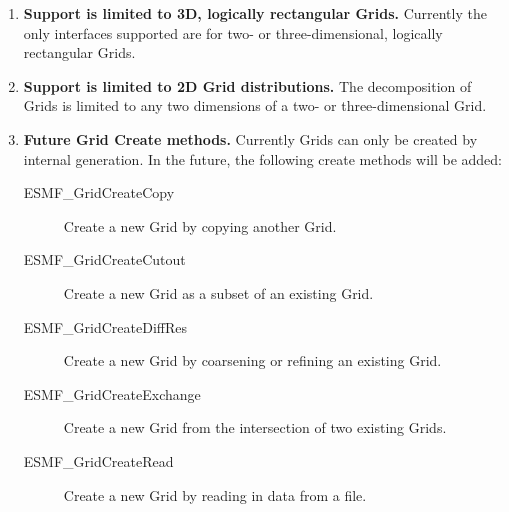 

\begin{enumerate}

\item {\bf Support is limited to 3D, logically rectangular Grids.} 
Currently the only interfaces supported are for two- or 
three-dimensional, logically rectangular Grids. 

\item {\bf Support is limited to 2D Grid distributions.} The 
decomposition of Grids is limited to any two dimensions of a two-
or three-dimensional Grid.

\item {\bf Future Grid Create methods.}  Currently Grids can only
be created by internal generation.  In the future, the following
create methods will be added:
 \begin{description}
    \item [ESMF\_GridCreateCopy]
          Create a new Grid by copying another Grid.
    \item [ESMF\_GridCreateCutout]
          Create a new Grid as a subset of an existing Grid.
    \item [ESMF\_GridCreateDiffRes]
          Create a new Grid by coarsening or refining an existing Grid.
    \item [ESMF\_GridCreateExchange]
          Create a new Grid from the intersection of two existing Grids.
    \item [ESMF\_GridCreateRead]
          Create a new Grid by reading in data from a file.
 \end{description}


\end{enumerate}
